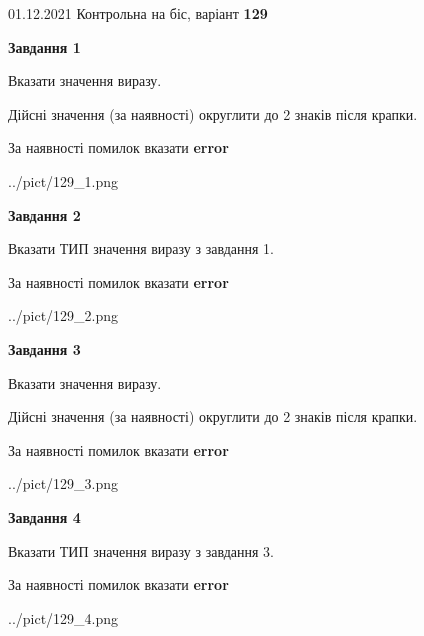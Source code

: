 \documentclass[11pt, ukrainian]{article}
\begin{document}
{01.12.2021 Контрольна на біс, варіант  \No \textbf { 129 }\par}
{
\begin {large}
{\begin {center}\textbf{Завдання 1}\end {center}}\par
Вказати значення виразу. \par
Дійсні значення (за наявності) округлити до 2 знаків після крапки. \par
За наявності помилок вказати \textbf{error}

\begin{center}
	{../pict/129_1.png}
\end{center}
\newpage

{\begin {center}\textbf{Завдання 2}\end {center}}\par
Вказати ТИП значення виразу з завдання 1. \par
За наявності помилок вказати \textbf{error}

\begin{center}
	{../pict/129_2.png}
\end{center}
\newpage

{\begin {center}\textbf{Завдання 3}\end {center}}\par
Вказати значення виразу. \par
Дійсні значення (за наявності) округлити до 2 знаків після крапки. \par
За наявності помилок вказати \textbf{error}

\begin{center}
	{../pict/129_3.png}
\end{center}
\newpage

{\begin {center}\textbf{Завдання 4}\end {center}}\par
Вказати ТИП значення виразу з завдання 3. \par
За наявності помилок вказати \textbf{error}

\begin{center}
	{../pict/129_4.png}
\end{center}
\newpage


\end{large}}
\end{document}
